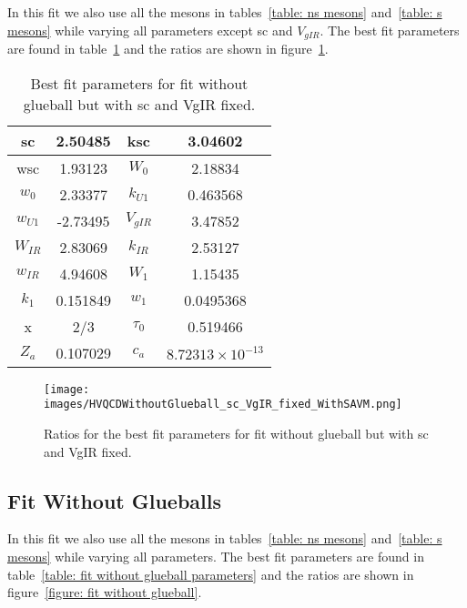 \documentclass[10 pt]{article}
\begin{document}
In this fit we also use all the mesons in tables~\ref{table: ns mesons} and~\ref{table: s mesons} while varying all parameters except sc and $V_{gIR}$. The best fit parameters are found in table~\ref{table: fit without glueball sc VgIR fixed parameters} and the ratios are shown in figure~\ref{figure: fit without glueball sc VgIR fixed}.

\begin{table}
\centering
\begin{tabular}{ | c | c | c | c |}
\hline
sc & 2.50485 & ksc & 3.04602 \\
\hline
wsc & 1.93123 & $W_0$ & 2.18834 \\
\hline
$w_0$ & 2.33377 & $k_{U1}$ & 0.463568 \\
\hline
$w_{U1}$ & -2.73495 & $V_{gIR}$ & 3.47852 \\
\hline
$W_{IR}$ & 2.83069 & $k_{IR}$ & 2.53127 \\
\hline
$w_{IR}$ & 4.94608 & $W_1$ & 1.15435\\
\hline
$k_1$ & 0.151849 & $w_1$ & 0.0495368\\
\hline
x & 2/3 & $\tau_0$ & 0.519466\\
\hline
$Z_a$ & 0.107029 & $c_a$ & $8.72313 \times 10^{-13}$\\
\hline
\end{tabular}
\caption{Best fit parameters for fit without glueball but with sc and VgIR fixed.}
\label{table: fit without glueball sc VgIR fixed parameters} 
\end{table}

\begin{figure}
  \center
  \texttt{[image: images/HVQCDWithoutGlueball\_sc\_VgIR\_fixed\_WithSAVM.png]} 
  \caption{Ratios for the best fit parameters for fit without glueball but with sc and VgIR fixed.}
  \label{figure: fit without glueball sc VgIR fixed}
\end{figure}

\subsection{Fit Without Glueballs}

In this fit we also use all the mesons in tables~\ref{table: ns mesons} and~\ref{table: s mesons} while varying all parameters. The best fit parameters are found in table~\ref{table: fit without glueball parameters} and the ratios are shown in figure~\ref{figure: fit without glueball}.
\end{document}
